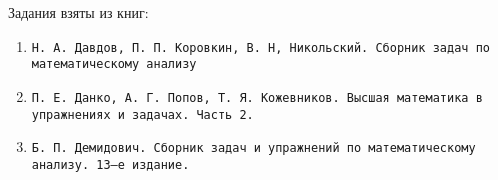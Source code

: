 Задания взяты из книг:

\begin{enumerate}

    \item {\tt Н. А. Давдов, П. П. Коровкин, В. Н, Никольский. Сборник задач по математическому анализу}

    \item {\tt П. Е. Данко, А. Г. Попов, Т. Я. Кожевников. Высшая математика в упражнениях и задачах. Часть 2.}

    \item {\tt Б. П. Демидович. Сборник задач и упражнений по математическому анализу. 13--е издание.}

\end{enumerate}